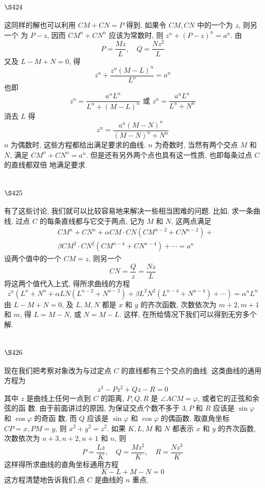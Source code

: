 \section{$\S 424$}

这同样的解也可以利用 $C M+C N=P$ 得到. 如果令 $C M, C N$ 中的一个为 $z$, 则另一个 为 $P-z$, 因而 $C M^{n}+C N^{n}$ 应该为常数时, 则 $z^{n}+(P-z)^{n}=a^{n}$. 由
\[
P=\frac{M z}{L}, \quad Q=\frac{N z^{2}}{L}
\]
又及 $L-M+N=0$, 得
\[
z^{n}+\frac{z^{n}(M-L)^{n}}{L^{n}}=a^{n}
\]
也即
\[
z^{n}=\frac{a^{n} L^{n}}{L^{n}+(M-L)^{n}} \text { 或 } z^{n}=\frac{a^{n} L^{n}}{L^{n}+N^{n}}
\]
消去 $L$ 得
\[
z^{n}=\frac{a^{n}(M-N)^{n}}{(M-N)^{n}+N^{n}}
\]
$n$ 为偶数时, 这些方程都给出满足要求的曲线. $n$ 为奇数时, 当然有两个交点 $M$ 和 $N$, 满足 $C M^{n}+C N^{n}=a^{n}$. 但是还有另外两个点也具有这一性质, 也即每条过点 $C$ 的直线都双倍 地满足要求.

\section{$\S 425$}

有了这些讨论, 我们就可以比较容易地来解决一些相当困难的问题. 比如, 求一条曲 线, 过点 $C$ 的每条直线都与它交于两点, 记为 $M$ 和 $N$, 这两点满足
\[
\begin{aligned}
& C M^{n}+C N^{n}+\alpha C M \cdot C N\left(C M^{n-2}+C N^{n-2}\right)+ \\
& \beta C M^{2} \cdot C N^{2}\left(C M^{n-4}+C N^{n-4}\right)+\cdots=a^{n}
\end{aligned}
\]
设两个值中的一个 $C M=z$, 则另一个
\[
C N=\frac{Q}{z}=\frac{N z}{L}
\]
将这两个值代入上式, 得所求曲线的方程
\[
z^{n}\left(L^{n}+N^{n}+\alpha L N\left(L^{n-2}+N^{n-2}\right)+\beta L^{2} N^{2}\left(L^{n-4}+N^{n-4}\right)+\cdots\right)=\alpha^{n} L^{n}
\]
由 $L-M+N=0$, 及 $L, M, N$ 都是 $x$ 和 $y$ 的齐次函数, 次数依次为 $m+2, m+1$ 和 $m$, 得 $L=M-N$, 或 $N=M-L$. 这样, 在所给情况下我们可以得到无穷多个解.

\section{$\S 426$}

现在我们把考察对象改为与过定点 $C$ 的直线都有三个交点的曲线. 这类曲线的通用 方程为
\[
z^{3}-P z^{2}+Q z-R=0
\]
其中 $z$ 是曲线上任何一点到 $C$ 的距离, $P, Q, R$ 是 $\angle A C M=\varphi$, 或者它的正弦和余弦的函 数. 由于前面讲过的原因, 为保证交点个数不多于 $3, P$ 和 $R$ 应该是 $\sin \varphi$ 和 $\cos \varphi$ 的奇函 数, 而 $Q$ 应该是 $\sin \varphi$ 和 $\cos \varphi$ 的偶函数. 取直角坐标 $C P=x, P M=y$, 则 $x^{2}+y^{2}=z^{2}$. 如果 $K, L, M$ 和 $N$ 都表示 $x$ 和 $y$ 的齐次函数, 次数依次为 $n+3, n+2, n+1$ 和 $n$, 则
\[
P=\frac{L z}{K}, \quad Q=\frac{M z^{2}}{K}, \quad R=\frac{N z^{3}}{K}
\]
这样得所求曲线的直角坐标通用方程
\[
K-L+M-N=0
\]
这方程清楚地告诉我们,点 $C$ 是曲线的 $n$ 重点.

